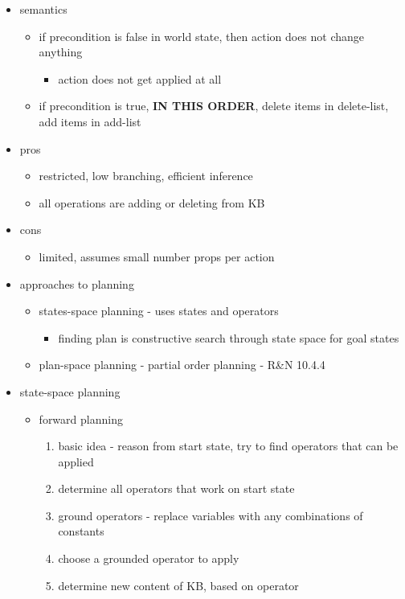 \documentclass[11pt]{article}
\begin{document}
\begin{description}
\begin{itemize}
\begin{itemize}
		\item semantics
		\begin{itemize}
			\item if precondition is false in world state, then action does not change anything
			\begin{itemize}
				\item action does not get applied at all
			\end{itemize}
			\item if precondition is true, \textbf{IN THIS ORDER}, delete items in delete-list, add items in add-list
		\end{itemize}
	
		\item pros
		\begin{itemize}
			\item restricted, low branching, efficient inference
			\item all operations are adding or deleting from KB
		\end{itemize}
	
		\item cons
		\begin{itemize}
			\item limited, assumes small number props per action
		\end{itemize}
	
		\item approaches to planning
		\begin{itemize}
			\item states-space planning - uses states and operators
			\begin{itemize}
				\item finding plan is constructive search through state space for goal states
			\end{itemize}
			
			\item plan-space planning - partial order planning - R\&N 10.4.4
		\end{itemize}
	
		\item state-space planning
		\begin{itemize}
			\item forward planning
			\begin{enumerate}
				\item basic idea - reason from start state, try to find operators that can be applied
				\item determine all operators that work on start state
				\item ground operators - replace variables with any combinations of constants
				\item choose a grounded operator to apply
				\item determine new content of KB, based on operator
			\end{enumerate}
			

\end{itemize}
\end{itemize}
\end{itemize}
\end{description}
\end{document}
